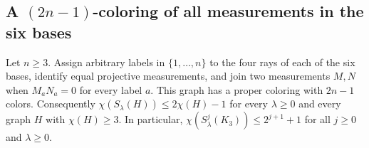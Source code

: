 \subsection{A \texorpdfstring{$(2n-1)$}{(2n-1)}-coloring of all measurements in the six bases}\label{app:five-coloring}

\begin{proposition}\label{prop:physical-upper}
Let $n\ge3$. Assign arbitrary labels in $\{1,\ldots,n\}$ to the four rays of each of the six bases, identify equal projective measurements, and join two measurements $M,N$ when $M_aN_a=0$ for every label $a$. This graph has a proper coloring with $2n-1$ colors. Consequently $\chi(S_\lambda(H))\le2\chi(H)-1$ for every $\lambda\ge0$ and every graph $H$ with $\chi(H)\ge3$. In particular, $\chi(S^j_\lambda(K_3))\le2^{j+1}+1$ for all $j\ge0$ and $\lambda\ge0$.
\end{proposition}
